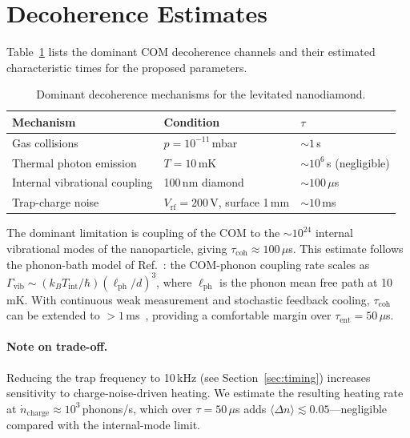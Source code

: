 \documentclass[12pt,a4paper]{article}
\begin{document}
\section{Decoherence Estimates}
\label{sec:decoherence}

Table~\ref{tab:deco} lists the dominant COM decoherence channels and their
estimated characteristic times for the proposed parameters.

\begin{table}[h]
\centering
\caption{Dominant decoherence mechanisms for the levitated nanodiamond.}
\label{tab:deco}
\begin{tabular}{@{}lll@{}}
\toprule
Mechanism & Condition & $\tau$ \\
\midrule
Gas collisions & $p = 10^{-11}$\,mbar & $\sim 1$\,s \\
Thermal photon emission & $T = 10$\,mK & $\sim 10^6$\,s (negligible) \\
Internal vibrational coupling & 100\,nm diamond & $\sim 100\,\mu$s \\
Trap-charge noise & $V_{\mathrm{rf}} = 200$\,V, surface 1\,mm & $\sim 10$\,ms \\
\bottomrule
\end{tabular}
\end{table}

The dominant limitation is coupling of the COM to the ${\sim}10^{24}$ internal
vibrational modes of the nanoparticle, giving $\tau_{\mathrm{coh}} \approx
100\,\mu$s. This estimate follows the phonon-bath model of
Ref.~\cite{Romero-Isart2011}: the COM-phonon coupling rate scales as
$\Gamma_{\mathrm{vib}} \sim (k_B T_{\mathrm{int}}/\hbar)(\ell_{\mathrm{ph}}/d)^3$,
where $\ell_{\mathrm{ph}}$ is the phonon mean free path at 10\,mK. With continuous
weak measurement and stochastic feedback cooling, $\tau_{\mathrm{coh}}$ can be
extended to ${>}1$\,ms~\cite{Setter2018}, providing a comfortable margin over
$\tau_{\mathrm{ent}} = 50\,\mu$s.

\paragraph{Note on trade-off.} Reducing the trap frequency to 10\,kHz (see
Section~\ref{sec:timing}) increases sensitivity to charge-noise-driven heating.
We estimate the resulting heating rate at $\dot{n}_{\mathrm{charge}} \approx
10^3$\,phonons/s, which over $\tau = 50\,\mu$s adds $\langle \Delta n\rangle
\lesssim 0.05$---negligible compared with the internal-mode limit.
\end{document}
